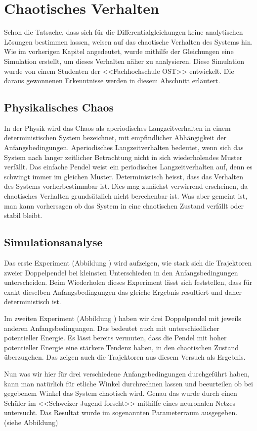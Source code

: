 \section{Chaotisches Verhalten}
Schon die Tatsache, dass sich für die Differentialgleichungen keine 
analytischen Lösungen bestimmen lassen, weisen auf das chaotische Verhalten
des Systems hin.
Wie im vorherigen Kapitel angedeutet, wurde mithilfe der Gleichungen eine Simulation erstellt,
um dieses Verhalten näher zu analysieren.
Diese Simulation wurde von einem Studenten der <<Fachhochschule OST>> entwickelt.%
Die daraus gewonnenen Erkenntnisse werden in diesem Abschnitt erläutert.

\subsection{Physikalisches Chaos}
In der Physik wird das Chaos als aperiodisches Langzeitverhalten in einem deterministischen
System bezeichnet, mit empfindlicher Abhängigkeit der Anfangsbedingungen.
Aperiodisches Langzeitverhalten bedeutet, wenn sich das System nach langer zeitlicher Betrachtung
nicht in sich wiederholendes Muster verfällt.
Das einfache Pendel weist ein periodisches Langzeitverhalten auf, denn es schwingt immer im gleichen 
Muster.
Deterministisch heisst, dass das Verhalten des Systems vorherbestimmbar ist.
Dies mag zunächst verwirrend erscheinen, da chaotisches Verhalten grundsätzlich nicht
berechenbar ist.
Was aber gemeint ist, man kann vorhersagen ob das System in eine chaotischen Zustand 
verfällt oder stabil bleibt.

\subsection{Simulationsanalyse}
Das erste Experiment (Abbildung ) wird aufzeigen, wie stark sich die Trajektoren zweier Doppelpendel 
bei kleinsten Unterschieden in den Anfangsbedingungen unterscheiden.
Beim Wiederholen dieses Experiment lässt sich feststellen, dass für exakt dieselben Anfangsbedingungen
das gleiche Ergebnis resultiert und daher deterministisch ist.

Im zweiten Experiment (Abbildung ) haben wir drei Doppelpendel mit jeweils anderen Anfangsbedingungen.
Das bedeutet auch mit unterschiedlicher potentieller Energie.
Es lässt bereits vermuten, dass die Pendel mit hoher potentieller Energie eine stärkere Tendenz haben,
in den chaotischen Zustand überzugehen.
Das zeigen auch die Trajektoren aus diesem Versuch als Ergebnis.

Nun was wir hier für drei verschiedene Anfangsbedingungen durchgeführt haben, kann man natürlich
für etliche Winkel durchrechnen lassen und beeurteilen ob bei gegebenem Winkel das System chaotisch wird.
Genau das wurde durch einen Schüler im <<Schweizer Jugend forscht>> mithilfe eines neuronalen Netzes
untersucht. %
Das Resultat wurde im sogenannten Parameterraum ausgegeben. (siehe Abbildung)
